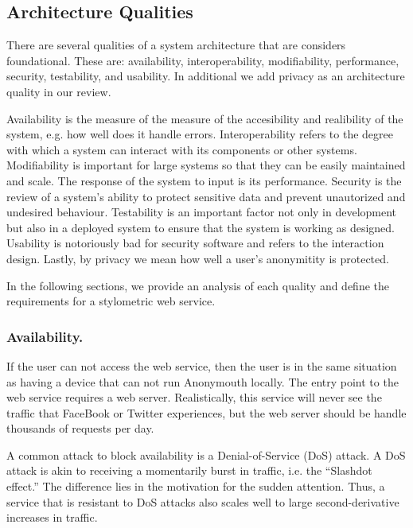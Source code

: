 \documentclass[letterpaper]{article}
\begin{document}
\subsection{Architecture Qualities}
There are several qualities of a system architecture that are
considers foundational\cite{Bass:2012:SAP:2392670}.  These are: availability,
interoperability, modifiability, performance, security, testability,
and usability.  In additional we add privacy as an architecture
quality in our review.

Availability is the measure of the measure of the accesibility and
realibility of the system, e.g. how well does it handle errors.
Interoperability refers to the degree with which a system can interact
with its components or other systems.  Modifiability is important for
large systems so that they can be easily maintained and scale.  The
response of the system to input is its performance.  Security is the
review of a system's ability to protect sensitive data and prevent
unautorized and undesired behaviour.  Testability is an important
factor not only in development but also in a deployed system to ensure
that the system is working as designed.  Usability is notoriously bad
for security software \cite{Whitten:1999:WJC:1251421.1251435} and
refers to the interaction design.  Lastly, by privacy we mean how well
a user's anonymitity is protected.

In the following sections, we provide an analysis of each quality and
define the requirements for a stylometric web service.


\subsubsection{Availability.}

If the user can not access the web service, then the user is in the
same situation as having a device that can not run Anonymouth
locally.  The entry point to the web service requires a web server.
Realistically, this service will never see the traffic that FaceBook
or Twitter experiences, but the web server should be handle thousands
of requests per day.

A common attack to block availability is a Denial-of-Service (DoS)
attack.  A DoS attack is akin to receiving a momentarily burst in
traffic, i.e. the ``Slashdot effect.''  The difference lies in the
motivation for the sudden attention.  Thus, a service that is
resistant to DoS attacks also scales well to large second-derivative
increases in traffic.
\end{document}
